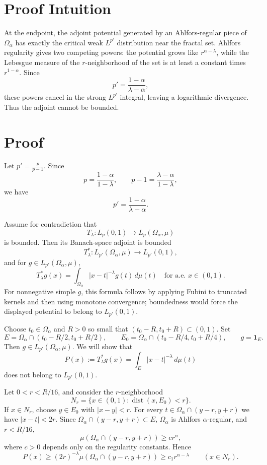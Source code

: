 \documentclass[11pt]{article}
\newcommand{\dist}{\operatorname{dist}}
\begin{document}
\section*{Proof Intuition}

At the endpoint, the adjoint potential generated by an Ahlfors-regular piece of
\(\Omega_\alpha\) has exactly the critical weak \(L^{p'}\) distribution near the
fractal set. Ahlfors regularity gives two competing powers: the potential grows
like \(r^{\alpha-\lambda}\), while the Lebesgue measure of the \(r\)-neighborhood
of the set is at least a constant times \(r^{1-\alpha}\). Since
\[
  p'=\frac{1-\alpha}{\lambda-\alpha},
\]
these powers cancel in the strong \(L^{p'}\) integral, leaving a logarithmic
divergence. Thus the adjoint cannot be bounded.

\section*{Proof}

Let \(p'=\frac{p}{p-1}\). Since
\[
  p=\frac{1-\alpha}{1-\lambda},
  \qquad
  p-1=\frac{\lambda-\alpha}{1-\lambda},
\]
we have
\[
  p'=\frac{1-\alpha}{\lambda-\alpha}.
\]

Assume for contradiction that
\[
  T_\lambda:L_p(0,1)\longrightarrow L_p(\Omega_\alpha,\mu)
\]
is bounded. Then its Banach-space adjoint is bounded
\[
  T_\lambda^*:L_{p'}(\Omega_\alpha,\mu)\longrightarrow L_{p'}(0,1),
\]
and for \(g\in L_{p'}(\Omega_\alpha,\mu)\),
\[
  T_\lambda^*g(x)=\int_{\Omega_\alpha}|x-t|^{-\lambda}g(t)\,d\mu(t)
  \quad\text{for a.e. }x\in(0,1).
\]
For nonnegative simple \(g\), this formula follows by applying Fubini to
truncated kernels and then using monotone convergence; boundedness would force
the displayed potential to belong to \(L_{p'}(0,1)\).

Choose \(t_0\in\Omega_\alpha\) and \(R>0\) so small that
\((t_0-R,t_0+R)\subset(0,1)\). Set
\[
  E=\Omega_\alpha\cap (t_0-R/2,t_0+R/2),
  \qquad
  E_0=\Omega_\alpha\cap (t_0-R/4,t_0+R/4),
  \qquad g=\mathbf 1_E .
\]
Then \(g\in L_{p'}(\Omega_\alpha,\mu)\). We will show that
\[
  P(x):=T_\lambda^*g(x)=\int_E |x-t|^{-\lambda}\,d\mu(t)
\]
does not belong to \(L_{p'}(0,1)\).

Let \(0<r<R/16\), and consider the \(r\)-neighborhood
\[
  N_r=\{x\in(0,1):\dist(x,E_0)<r\}.
\]
If \(x\in N_r\), choose \(y\in E_0\) with \(|x-y|<r\). For every
\(t\in\Omega_\alpha\cap(y-r,y+r)\) we have \(|x-t|<2r\). Since
\(\Omega_\alpha\cap(y-r,y+r)\subset E\), \(\Omega_\alpha\) is Ahlfors
\(\alpha\)-regular, and \(r<R/16\),
\[
  \mu(\Omega_\alpha\cap(y-r,y+r))\ge c r^\alpha,
\]
where \(c>0\) depends only on the regularity constants. Hence
\[
  P(x)\ge (2r)^{-\lambda}\mu(\Omega_\alpha\cap(y-r,y+r))
  \ge c_1 r^{\alpha-\lambda}
  \qquad (x\in N_r).
\]
\end{document}
